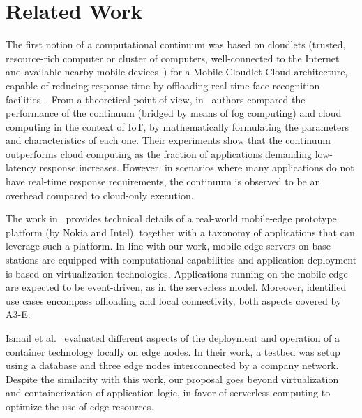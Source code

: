 \section{Related Work}
\label{sec:related}


The first notion of a computational continuum was based on cloudlets (trusted, resource-rich computer or cluster of computers, well-connected to the Internet and available nearby mobile devices~\cite{Satyanarayanan09cloudlets}) for a Mobile-Cloudlet-Cloud architecture, capable of reducing response time by offloading real-time face recognition facilities~\cite{Soyata:2012}. From a theoretical point of view, in~\cite{sarkar2015assessment} authors compared the performance of the continuum (bridged by means of fog computing) and cloud computing in the context of IoT, by mathematically formulating the parameters and characteristics of each one. Their experiments show that the continuum outperforms cloud computing as the fraction of applications demanding low-latency response increases. However, in scenarios where many applications do not have real-time response requirements, the continuum is observed to be an overhead compared to cloud-only execution.





The work in~\cite{beck2014mobile} provides technical details of a real-world mobile-edge prototype platform (by Nokia and Intel), together with a taxonomy of applications that can leverage such a platform. In line with our work, mobile-edge servers on base stations are equipped with computational capabilities and application deployment is based on virtualization technologies. Applications running on the mobile edge are expected to be event-driven, as in the serverless model. Moreover, identified use cases encompass offloading and local connectivity, both aspects covered by A3-E. 

Ismail et al.~\cite{ismail2015icos} evaluated different aspects of the deployment and operation of a container technology locally on edge nodes. In their work, a testbed was setup using a database and three edge nodes interconnected by a company network. Despite the similarity with this work, our proposal goes beyond virtualization and containerization of application logic, in favor of serverless computing to optimize the use of edge resources.


